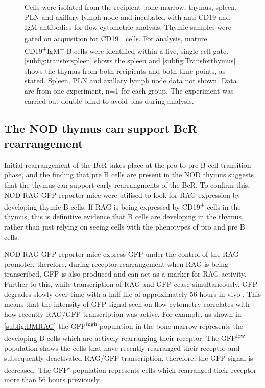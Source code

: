 \begin{figure}
{Cells were isolated from the recipient bone marrow, thymus, spleen, PLN and axillary lymph node and incubated with anti-CD19 and -IgM antibodies for flow cytometric analysis.
Thymic samples were gated on acquisition for CD19\textsuperscript{+} cells.
For analysis, mature CD19\textsuperscript{+}IgM\textsuperscript{+} B cells were identified within a live, single cell gate.
\ref{subfig:transferspleen} shows the spleen and \ref{subfig:Transferthymus} shows the thymus from both recipients and both time points, as stated. Spleen, PLN and axillary lymph node data not shown.
Data are from one experiment, n=1 for each group.
The experiment was carried out double blind to avoid bias during analysis.}
\label{fig:Transfer}
\end{figure}





\subsection{The NOD thymus can support BcR rearrangement}

Initial rearrangement of the BcR takes place at the pro to pre B cell transition phase, and the finding that pre B cells are present in the NOD thymus suggests that the thymus can support early rearrangments of the BcR.
To confirm this, NOD-RAG-GFP reporter mice were utilised to look for RAG expression by developing thymic B cells.
If RAG is being expressed by CD19\textsuperscript{+} cells in the thymus, this is definitive evidence that B cells are developing in the thymus, rather than just relying on seeing cells with the phenotypes of pro and pre B cells.

NOD-RAG-GFP reporter mice express GFP under the control of the RAG promoter, therefore, during receptor rearrangement when RAG is being transcribed, GFP is also produced and can act as a marker for RAG activity.
Further to this, while transcription of RAG and GFP cease simultaneously, GFP degrades slowly over time with a half life of approximately 56 hours in vivo \citep{McCaughtry2007}.
This means that the intensity of GFP signal seen on flow cytometry correlates with how recently RAG/GFP transcription was active.
For example, as shown in \cref{subfig:BMRAG} the GFP\textsuperscript{high} population in the bone marrow represents the developing B cells which are actively rearranging their receptor.
The GFP\textsuperscript{low} population shows the cells that have recently rearranged their receptor and subsequently deactivated RAG/GFP transcription, therefore, the GFP signal is decreased.
The GFP\textsuperscript{-} population represents cells which rearranged their receptor more than 56 hours previously.

